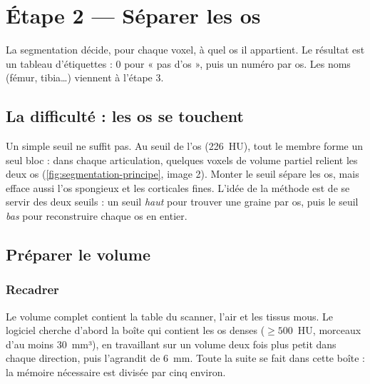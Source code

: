 \chapter{Étape 2 — Séparer les os}
\label{chap:segmentation}

\begin{chapeau}
La segmentation décide, pour chaque voxel, à quel os il appartient. Le résultat est un tableau d'étiquettes : 0 pour
« pas d'os », puis un numéro par os. Les noms (fémur, tibia\ldots) viennent à l'étape 3.
\end{chapeau}

\section{La difficulté : les os se touchent}

Un simple seuil ne suffit pas. Au seuil de l'os (226~HU), tout le membre forme un seul bloc : dans chaque articulation,
quelques voxels de volume partiel relient les deux os (\cref{fig:segmentation-principe}, image 2). Monter le seuil
sépare les os, mais efface aussi l'os spongieux et les corticales fines. L'idée de la méthode est de se servir des
deux seuils : un seuil \emph{haut} pour trouver une graine par os, puis le seuil \emph{bas} pour reconstruire chaque os
en entier.


\section{Préparer le volume}

\subsection{Recadrer}

Le volume complet contient la table du scanner, l'air et les tissus mous. Le logiciel cherche d'abord la boîte qui
contient les os denses ($\geq 500$~HU, morceaux d'au moins 30~mm³), en travaillant sur un volume deux fois plus petit
dans chaque direction, puis l'agrandit de 6~mm. Toute la suite se fait dans cette boîte : la mémoire nécessaire est
divisée par cinq environ.

